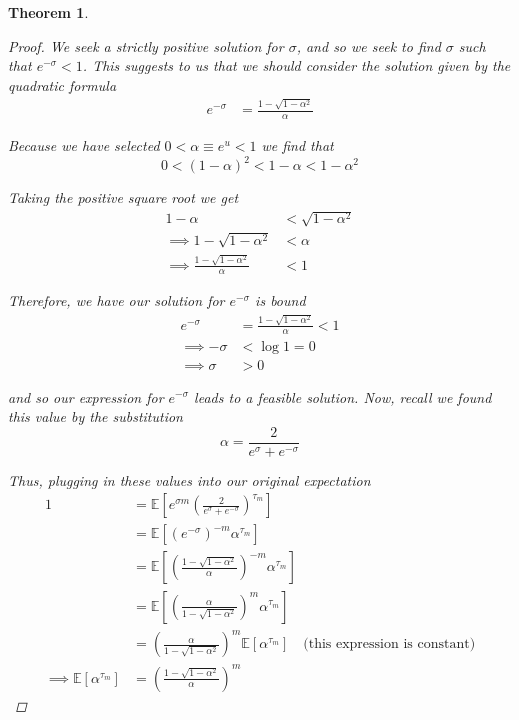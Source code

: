 \documentclass[12pt]{article}
\newtheorem{theorem}{Theorem}
\newlength\tindent
\renewcommand{\indent}{\hspace*{\tindent}}
\newcommand{\E}{\mathbb E}
\begin{document}
\begin{theorem}
\begin{proof}
\indent We seek a strictly positive solution for $\sigma$, and so we seek to find $\sigma$ such that $e^{-\sigma} < 1$. This suggests to us that we should consider the solution given by the quadratic formula
\begin{align*}
	e^{-\sigma} &=  \frac{ 1 - \sqrt{1 - \alpha^2} }{ \alpha }
\end{align*}

Because we have selected $0 < \alpha \equiv e^u < 1$ we find that
\begin{equation*}
	0 < (1 - \alpha)^2 < 1 - \alpha < 1 - \alpha^2
\end{equation*}

Taking the positive square root we get
\begin{align*}
	1 - \alpha &< \sqrt{1 - \alpha^2} \\
	\implies 1 - \sqrt{1 - \alpha^2} &< \alpha \\
	\implies \frac{1 - \sqrt{1 - \alpha^2}}{\alpha} &< 1
\end{align*}

Therefore, we have our solution for $e^{-\sigma}$ is bound 
\begin{align*}
	e^{-\sigma} &= \frac{1 - \sqrt{1 - \alpha^2}}{\alpha} < 1 \\
	\implies -\sigma &< \log 1 = 0 \\
	\implies \sigma &> 0
\end{align*}

and so our expression for $e^{-\sigma}$ leads to a feasible solution. Now, recall we found this value by the substitution
\begin{equation*}
	\alpha = \frac{2}{e^\sigma + e^{-\sigma}}
\end{equation*}

Thus, plugging in these values into our original expectation
\begin{align*}
	1 &= \E \left[ e^{\sigma m} \left( \frac{2}{ e^\sigma + e^{-\sigma}} \right)^{\tau_m} \right] \\
	&= \E \left[ \left(e^{-\sigma} \right)^{-m} \alpha^{\tau_m} \right]  \\
	&= \E \left[ \left( \frac{1 - \sqrt{1 - \alpha^2}}{\alpha} \right)^{-m} \alpha^{\tau_m} \right]  \\
	&= \E \left[ \left( \frac{\alpha}{1 - \sqrt{1 - \alpha^2}} \right)^m \alpha^{\tau_m} \right] \\
	&=  \left( \frac{\alpha}{1 - \sqrt{1 - \alpha^2}} \right)^m \E \left[ \alpha^{\tau_m} \right] \quad \text{(this expression is constant)} \\
	\implies \E \left[\alpha^{\tau_m} \right] &= \left( \frac{1 - \sqrt{1 - \alpha^2}}{\alpha} \right)^m
\end{align*}


\end{proof}
\end{theorem}
\end{document}
